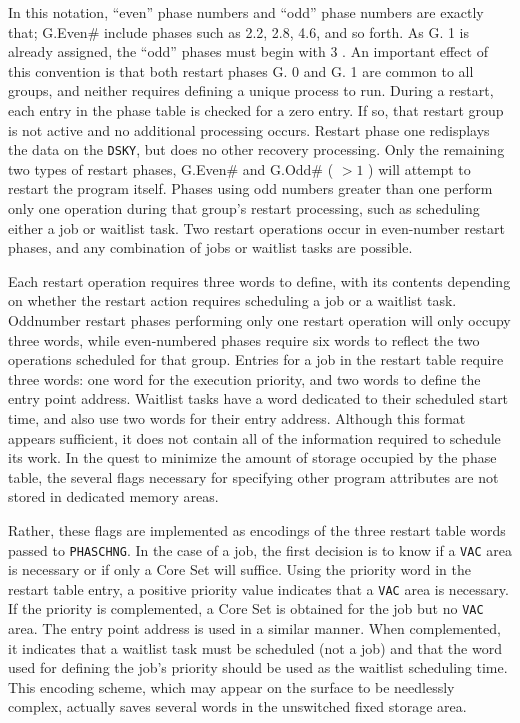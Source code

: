 \documentclass[refcap, oxford]{ahsan}
\begin{document}
In this notation, ``even'' phase numbers and ``odd'' phase numbers are exactly that; G.Even\# include phases such as 2.2, 2.8, 4.6, and so forth. As G. 1 is already assigned, the ``odd'' phases must begin with 3 . An important effect of this convention is that both restart phases G. 0 and G. 1 are common to all groups, and neither requires defining a unique process to run. During a restart, each entry in the phase table is checked for a zero entry. If so, that restart group is not active and no additional processing occurs. Restart phase one redisplays the data on the \texttt{DSKY}, but does no other recovery processing. Only the remaining two types of restart phases, G.Even\# and G.Odd\# ( $>1$ ) will attempt to restart the program itself. Phases using odd numbers greater than one perform only one operation during that group's restart processing, such as scheduling either a job or waitlist task. Two restart operations occur in even-number restart phases, and any combination of jobs or waitlist tasks are possible.

Each restart operation requires three words to define, with its contents depending on whether the restart action requires scheduling a job or a waitlist task. Oddnumber restart phases performing only one restart operation will only occupy three words, while even-numbered phases require six words to reflect the two operations scheduled for that group. Entries for a job in the restart table require three words: one word for the execution priority, and two words to define the entry point address. Waitlist tasks have a word dedicated to their scheduled start time, and also use two words for their entry address. Although this format appears sufficient, it does not contain all of the information required to schedule its work. In the quest to minimize the amount of storage occupied by the phase table, the several flags necessary for specifying other program attributes are not stored in dedicated memory areas.

Rather, these flags are implemented as encodings of the three restart table words passed to \texttt{PHASCHNG}. In the case of a job, the first decision is to know if a \texttt{VAC} area is necessary or if only a Core Set will suffice. Using the priority word in the restart table entry, a positive priority value indicates that a \texttt{VAC} area is necessary. If the priority is complemented, a Core Set is obtained for the job but no \texttt{VAC} area. The entry point address is used in a similar manner. When complemented, it indicates that a waitlist task must be scheduled (not a job) and that the word used for defining the job's priority should be used as the waitlist scheduling time. This encoding scheme, which may appear on the surface to be needlessly complex, actually saves several words in the unswitched fixed storage area.
\end{document}
